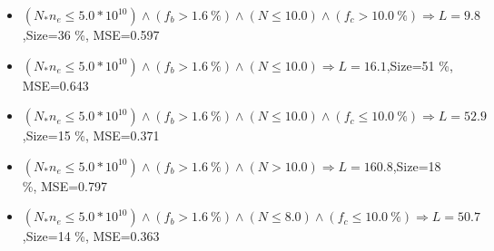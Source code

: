 \documentclass[numbered]{CSL}
\begin{document}
\begin{itemize}
\item $(N_* n_e \leq 5.0 * 10^{10}) \land (f_b > 1.6~\%) \land (N \leq 10.0) \land (f_c > 10.0~\%) \Rightarrow L = 9.8$,\hfill Size=36 \%, MSE=0.597
\item $(N_* n_e \leq 5.0 * 10^{10}) \land (f_b > 1.6~\%) \land (N \leq 10.0) \Rightarrow L = 16.1$,\hfill Size=51 \%, MSE=0.643
\item $(N_* n_e \leq 5.0 * 10^{10}) \land (f_b > 1.6~\%) \land (N \leq 10.0) \land (f_c \leq 10.0~\%) \Rightarrow L = 52.9$,\hfill Size=15 \%, MSE=0.371
\item $(N_* n_e \leq 5.0 * 10^{10}) \land (f_b > 1.6~\%) \land (N > 10.0) \Rightarrow L = 160.8$,\hfill Size=18 \%, MSE=0.797
\item $(N_* n_e \leq 5.0 * 10^{10}) \land (f_b > 1.6~\%) \land (N \leq 8.0) \land (f_c \leq 10.0~\%) \Rightarrow L = 50.7$,\hfill Size=14 \%, MSE=0.363
\end{itemize}
\end{document}
